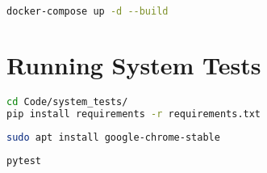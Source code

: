 
\begin{lstlisting}[language=bash, caption={Docker compose.}, label=lst:docker_compose]
docker-compose up -d --build
\end{lstlisting}


\section{Running System Tests}


\begin{lstlisting}[language=bash, caption={Install requirements.}, label=lst:requirements]
cd Code/system_tests/
pip install requirements -r requirements.txt
\end{lstlisting}

\begin{lstlisting}[language=bash, caption={Install Google Chrome.}]
sudo apt install google-chrome-stable
\end{lstlisting}

\begin{lstlisting}[language=bash, caption={Run tests.}]
pytest
\end{lstlisting}